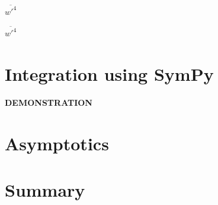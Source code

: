 \documentclass[10pt]{beamer}
\begin{document}
    \begin{frame}{$\overline{w'^4}$}

    \end{frame}

    \begin{frame}{$\overline{w'^4}$}

    \end{frame}


    \section{Integration using SymPy}\label{sec:integration-using-sympy}

    \begin{frame}
        \begin{center}
            \textbf{DEMONSTRATION}
        \end{center}
    \end{frame}


    \section{Asymptotics}\label{sec:asymptotics}

    \begin{frame}{}

    \end{frame}


    \section{Summary}\label{sec:summary}

    \begin{frame}{}

    \end{frame}
\end{document}
